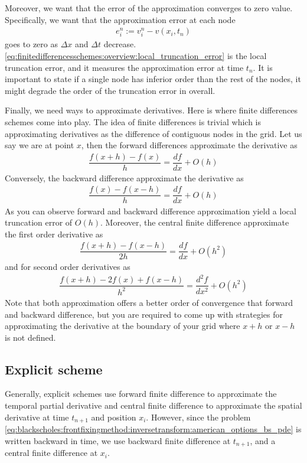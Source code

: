 Moreover, we want that the error of the approximation converges to zero value. Specifically, we want that the approximation error at each node 
\begin{align}
  \label{eq:finitedifferencesschemes:overview:local_truncation_error}
  e^{n}_i := v^{n}_i-v(x_i, t_n)
\end{align}
goes to zero as $\Delta{x}$ and $\Delta{t}$ decrease. \eqref{eq:finitedifferencesschemes:overview:local_truncation_error} is the local truncation error, and it measures the approximation error at time $t_n$. It is important to state if a single node has inferior order than the rest of the nodes, it might degrade the order of the truncation error in overall.   

Finally, we need ways to approximate derivatives. Here is where finite differences schemes come into play. The idea of finite differences is trivial which is approximating derivatives as the difference of contiguous nodes in the grid. Let us say we are at point $x$, then the forward differences approximate the derivative as
\begin{align*}
 \dfrac{f(x + h) - f(x)}{h} = \dfrac{df}{dx} + O(h)
\end{align*}
Conversely, the backward difference approximate the derivative as 
\begin{align*}
  \dfrac{f(x) - f(x-h)}{h} = \dfrac{df}{dx} + O(h)
\end{align*}
As you can observe forward and backward difference approximation yield a local truncation error of $O(h)$. Moreover, the central finite difference approximate the first order derivative as 
\begin{align*}
  \dfrac{f(x+h) - f(x-h)}{2h} = \dfrac{df}{dx} + O(h^2)
 \end{align*}
and for second order derivatives as
\begin{align*}
  \dfrac{f(x+h) - 2f(x) + f(x-h)}{h^2} = \dfrac{d^2f}{dx^2} + O(h^2)
 \end{align*}
Note that both approximation offers a better order of convergence that forward and backward difference, but you are required to come up with strategies for approximating the derivative at the boundary of your grid where $x+h$ or $x-h$ is not defined.

\subsection{Explicit scheme}
Generally, explicit schemes use forward finite difference to approximate the temporal partial derivative and central finite difference to approximate the spatial derivative at time $t_{n+1}$ and position $x_i$. However, since the problem \eqref{eq:blackscholes:frontfixingmethod:inversetransform:american_options_bs_pde} is written backward in time, we use backward finite difference at $t_{n+1}$, and a central finite difference at $x_i$.

